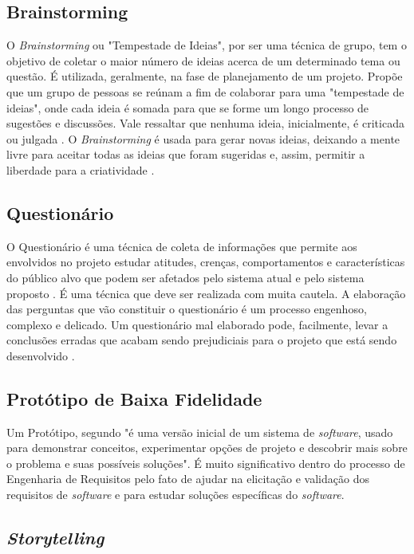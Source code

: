 \subsection{Brainstorming}
O \textit{Brainstorming} ou "Tempestade de Ideias", por ser uma técnica de grupo, tem o objetivo de coletar o maior número de ideias acerca de um determinado tema ou questão. É utilizada, geralmente, na fase de planejamento de um projeto. Propõe que um grupo de pessoas se reúnam a fim de colaborar para uma "tempestade de ideias", onde cada ideia é somada para que se forme um longo processo de sugestões e discussões. Vale ressaltar que nenhuma ideia, inicialmente, é criticada ou julgada \cite{mazzotti2012exploraccao}. O \textit{Brainstorming} é usada para gerar novas ideias, deixando a mente livre para aceitar todas as ideias que foram sugeridas e, assim, permitir a liberdade para a criatividade \cite{batista2003taxonomia}.

\subsection{Questionário}
O Questionário é uma técnica de coleta de informações que permite aos envolvidos no projeto estudar atitudes, crenças, comportamentos e características do público alvo que podem ser afetados pelo sistema atual e pelo sistema proposto \cite{kendall1992systems}. É uma técnica que deve ser realizada com muita cautela. A elaboração das perguntas que vão constituir o questionário é um processo engenhoso, complexo e delicado. Um questionário mal elaborado pode, facilmente, levar a conclusões erradas que acabam sendo prejudiciais para o projeto que está sendo desenvolvido \cite{bastosjunior}.

\subsection{Protótipo de Baixa Fidelidade}
Um Protótipo, segundo \cite{Sommerville10} "é uma versão inicial de um sistema de \textit{software}, usado para demonstrar conceitos, experimentar opções de projeto e descobrir mais sobre o problema e suas possíveis soluções". É muito significativo dentro do processo de Engenharia de Requisitos pelo fato de ajudar na elicitação e validação dos requisitos de \textit{software} e para estudar soluções específicas do \textit{software}.

\subsection{\textit{Storytelling}}

